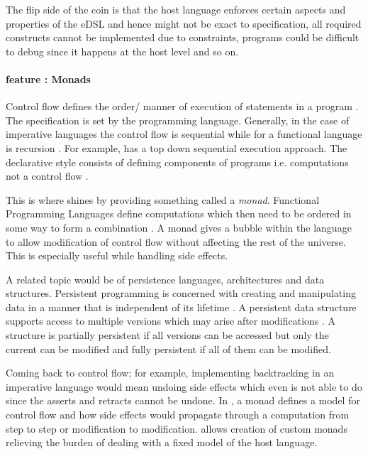 \documentclass[thesis-solanki.tex]{subfiles}
\begin{document}
  The flip side of the coin is that the host language enforces certain aspects and properties of the eDSL and hence
  might not be exact to specification, all required constructs cannot be implemented due to constraints, programs
  could be difficult to debug since it happens at the host level and so on.

\paragraph{ feature : Monads}
Control flow defines the order/ manner of execution of statements in a pro\-gram \cite{website:controlflowwiki}.
The specification is set by the programming language.
Generally, in the case of imperative languages the control flow is sequential while for a functional language is
recursion \cite{website:controlflowdalhousie}.
For example,  has a top down sequential execution approach.
The declarative style consists of defining components of programs i.e.
computations not a control flow \cite{website:declarativeprogrammingwiki}.

This is where  shines by providing something called a \textit{monad}.
Functional Programming Languages
define computations which then need to be ordered in some way to form a
combination \cite{website:monadascomputation}.
A monad gives a bubble within the language to allow modification of control flow without affecting the rest of the
universe.
This is especially useful while handling side effects.

A related topic would be of persistence languages, architectures and data structures.
Persistent programming is concerned with creating and manipulating data in a manner that is independent of its
lifetime \cite{morrison1990persistent}.
A persistent data structure supports access to multiple versions which may arise after modifications
\cite{driscoll1986making, website:persistentdatastructuresmit}.
A structure is partially persistent if all versions can be accessed but only the current can be modified and fully
persistent if all of them can be modified.

Coming back to control flow; for example, implementing backtracking in an imperative language would mean undoing
side effects which even  is not able to do since the asserts and retracts cannot be undone.
In , a monad defines a model for control flow and how side effects would propagate through a
computation from step to step or modification to modification.
 allows creation of custom monads relieving the burden of dealing with a fixed model of the
host language.
\end{document}
